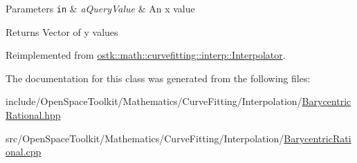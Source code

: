 \begin{DoxyParams}[1]{Parameters}
\mbox{\tt in}  & {\em a\+Query\+Value} & An x value \\
\hline
\end{DoxyParams}
\begin{DoxyReturn}{Returns}
Vector of y values 
\end{DoxyReturn}


Reimplemented from \hyperlink{classostk_1_1math_1_1curvefitting_1_1interp_1_1_interpolator_af678ba11fe02754aeaa821bc101fcd87}{ostk\+::math\+::curvefitting\+::interp\+::\+Interpolator}.



The documentation for this class was generated from the following files\+:\begin{DoxyCompactItemize}
\item 
include/\+Open\+Space\+Toolkit/\+Mathematics/\+Curve\+Fitting/\+Interpolation/\hyperlink{_barycentric_rational_8hpp}{Barycentric\+Rational.\+hpp}\item 
src/\+Open\+Space\+Toolkit/\+Mathematics/\+Curve\+Fitting/\+Interpolation/\hyperlink{_barycentric_rational_8cpp}{Barycentric\+Rational.\+cpp}\end{DoxyCompactItemize}
